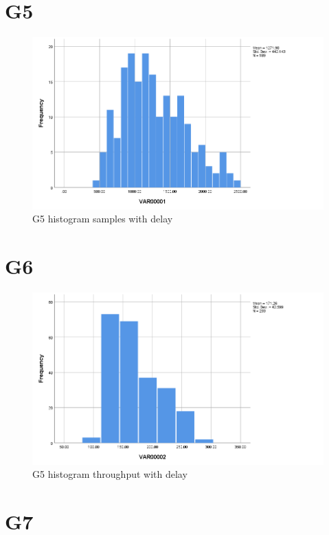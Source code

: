 \documentclass[hidelinks, 12pt, a4paper]{article}
\begin{document}
\section{G5}

\begin{figure}[h!]
	\centering
		\includegraphics[height=.38\textheight, width=\textwidth]{assets/session2/g5.png}
		\caption{G5 histogram samples with delay} 
	\end{figure}

\section{G6}

\begin{figure}[h!]
	\centering
		\includegraphics[height=.38\textheight, width=\textwidth]{assets/session2/g6.png}
		\caption{G5 histogram throughput with delay} 
	\end{figure}

\section{G7}
\end{document}
